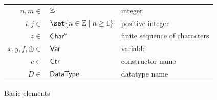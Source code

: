 \begin{figure}[H]
\small
\begin{tabularx}{\textwidth}{rll}
   $n, m \in$
   &
   $\mathbb{Z}$
   &
   integer
   \\
   $i, j \in$
   &
   $\set{n \in \Int \mid n \numgeq 1}$
   &
   positive integer
   \\
   $z \in$
   &
   $\textup{\textsf{Char}}^*$
   &
   finite sequence of characters
   \\
   $x, y, f, \oplus \in$
   &
   $\textup{\textsf{Var}}$
   &
   variable
   \\
   $c \in$
   &
   $\textup{\textsf{Ctr}}$
   &
   constructor name
   \\
   $D \in$
   &
   $\textup{\textsf{DataType}}$
   &
   datatype name
\end{tabularx}
\caption{Basic elements}
\label{fig:basic-elements}
\end{figure}
